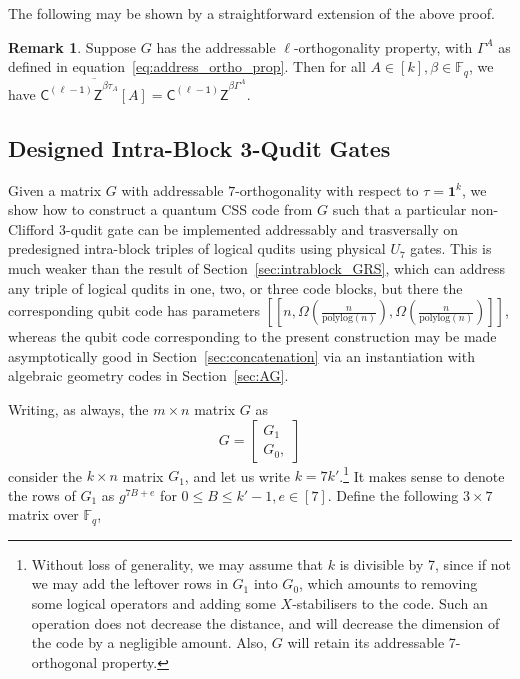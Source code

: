 \documentclass[11pt]{article}
\theoremstyle{definition}
\newtheorem{remark}[theorem]{Remark}
\renewcommand{\le}{\leqslant}
\newcommand{\CLZ}{\mathsf{C^{(\ell-1)}Z}}
\newcommand{\FF}{\mathbb{F}}
\newcommand*{\ol}{\overline}
\begin{document}
The following may be shown by a straightforward extension of the above proof.
\begin{remark}
    Suppose $G$ has the addressable $\ell$-orthogonality property, with $\Gamma^A$ as defined in equation~\eqref{eq:address_ortho_prop}. Then for all $A\in [k], \beta\in \FF_q$, we have $\ol{\CLZ^{\beta\tau_A}[A]} = \CLZ^{\beta\Gamma^A}$.
\end{remark}

\subsection{Designed Intra-Block 3-Qudit Gates}\label{sec:designed_intrablock}

Given a matrix $G$ with addressable $7$-orthogonality with respect to $\tau = \mathbf{1}^k$, we show how to construct a quantum CSS code from $G$ such that a particular non-Clifford 3-qudit gate 
can be implemented addressably and trasversally on predesigned intra-block triples of logical qudits using physical $U_7$ gates. This is much weaker than the result of Section~\ref{sec:intrablock_GRS}, which can address any triple of logical qudits in one, two, or three code blocks, but there the corresponding qubit code has parameters $\left[\left[n,\Omega\left(\frac{n}{\text{polylog}(n)}\right),\Omega\left(\frac{n}{\text{polylog}(n)}\right)\right]\right]$, whereas the qubit code corresponding to the present construction may be made asymptotically good in Section~\ref{sec:concatenation} via an instantiation with algebraic geometry codes in Section~\ref{sec:AG}.

Writing, as always, the $m \times n$ matrix $G$ as
\begin{equation}
    G = \begin{bmatrix}
        G_1\\G_0,
    \end{bmatrix}
\end{equation}
consider the $k\times n$ matrix $G_1$, and let us write $k = 7k'$.\footnote{Without loss of generality, we may assume that $k$ is divisible by 7, since if not we may add the leftover rows in $G_1$ into $G_0$, which amounts to removing some logical operators and adding some $X$-stabilisers to the code. Such an operation does not decrease the distance, and will decrease the dimension of the code by a negligible amount. Also, $G$ will retain its addressable 7-orthogonal property.} 
It makes sense to denote the rows of $G_1$ as $g^{7B+e}$ for $0\le B\le k'-1, e\in [7]$. 
Define the following $3\times 7$ matrix over $\FF_q$,
\end{document}
